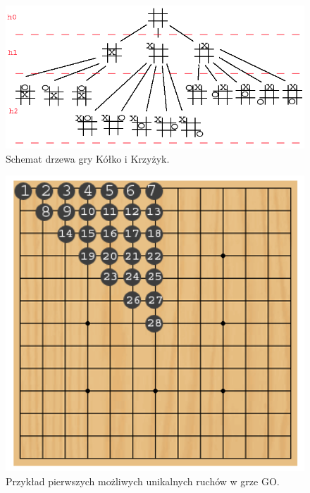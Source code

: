 \begin{par}
\begin{figure}[!h]
	\centering
	\includegraphics[width=5in]{obrazki/chess_tree.png}
	\caption{Schemat drzewa gry Kółko i Krzyżyk.}
	\label{fig:xo_tree}
\end{figure}

\begin{figure}[!h]
	\centering
	\includegraphics[width=5in]{obrazki/go_tree.png}
	\caption{Przykład pierwszych możliwych unikalnych ruchów w grze GO.}
	\label{fig:go_tree}
\end{figure}

\end{par}
